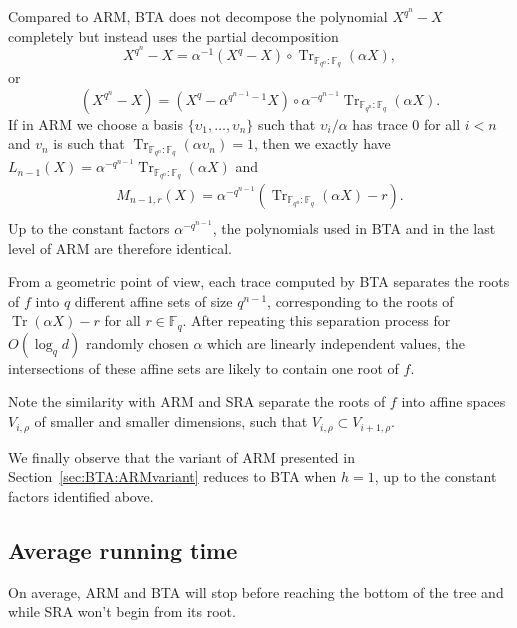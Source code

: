 \documentclass{sig-alternate}
\newcommand{\ff}[1]{\mathbb{F}_{#1}}
\newcommand{\fq}{\ff{q}}
\newcommand{\dd}{d}
\newcommand{\qq}{q}
\newcommand{\nn}{n}
\newcommand{\qn}{{\qq^\nn}}
\newcommand{\basef}{\ff{\qq}}
\newcommand{\extf}{\ff{\qn}}
\DeclareMathOperator{\Tr}{Tr}
\newcommand{\trabs}[2]{\Tr_{#1:#2}}
\newcommand{\trextbase}{\trabs{\extf}{\basef}}
\begin{document}
Compared to ARM, BTA does not decompose the polynomial $X^{\qq^\nn}-X$ completely but instead uses the partial decomposition
\begin{equation*}
X^{\qq^\nn}-X=\alpha^{-1}(X^\qq- X)\circ\trextbase(\alpha X),  
\end{equation*}
or
\begin{equation*}
  (X^{q^n}-X) = (X^q- \alpha^{q^{n-1}-1} X)  \circ \alpha^{-q^{n-1}}\trextbase(\alpha X).  
\end{equation*}
If in ARM we choose a basis $\{\upsilon_1,\ldots,\upsilon_{\nn}\}$
such that $\upsilon_i/\alpha$ has trace 0 for all $i<\nn$ and $v_n$ is such that $\trextbase(\alpha \upsilon_n)=1$, then we exactly have
$L_{\nn-1}(X)=\alpha^{-q^{n-1}}\trextbase(\alpha X)$ and
\begin{multline*}
  M_{\nn-1,r}(X)=  \alpha^{-\qq^{\nn-1}}\left(\trextbase(\alpha X)-r\right). \\
\end{multline*}
Up to the constant factors $\alpha^{-q^{n-1}}$, the polynomials used
in BTA and in the last level of ARM are therefore identical.

From a geometric point of view, each trace computed by BTA separates the roots of $f$ into $q$ different affine sets of size $\qq^{\nn-1}$, corresponding to the roots of $\Tr(\alpha X)-r$ for all $r\in\fq$. After repeating this separation process for $O(\log_\qq\dd)$  randomly chosen $\alpha$ which are linearly independent values, the intersections of these affine sets are likely to contain one root of $f$.

Note the similarity with ARM and SRA separate the roots of $f$ into affine spaces $V_{i,\rho}$ of smaller and smaller dimensions, such that $V_{i,\rho}\subset V_{i+1,\rho}$. 

We finally observe that the variant of ARM presented in Section~\ref{sec:BTA:ARMvariant} reduces to BTA when $h=1$, up to the constant factors identified above.


\subsection{Average running time}
\label{sec:avg}

On average, ARM and BTA will stop before reaching the bottom of the tree and while SRA won't begin from its root.

\medskip
\end{document}
